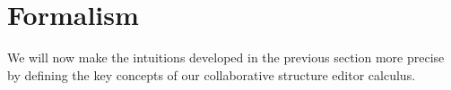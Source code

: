 \documentclass[nonacm, acmsmall, screen, review]{acmart}
\newcommand{\e}{\varepsilon}
\newcommand{\id}[1]{\textcolor{gray}{\ensuremath{#1}}}
\newcommand{\eid}[2]{{#2}^{\id{#1}}}
\newcommand{\ePlus}[3]{#2~\eid{#1}{\texttt{+}}~#3}
\newcommand{\eTimes}[3]{#2~\eid{#1}{\texttt{*}}~#3}
\newcommand{\hole}{\ensuremath{\square}} %
\newcommand{\cycleVertex}[1]{\textcolor{red}{\ensuremath{\circlearrowleft_{#1}}}}
\begin{document}




\section{Formalism}
\label{sec:formalism}

We will now make the intuitions developed in the previous section more precise by defining the key concepts of our collaborative structure editor calculus.
\end{document}
